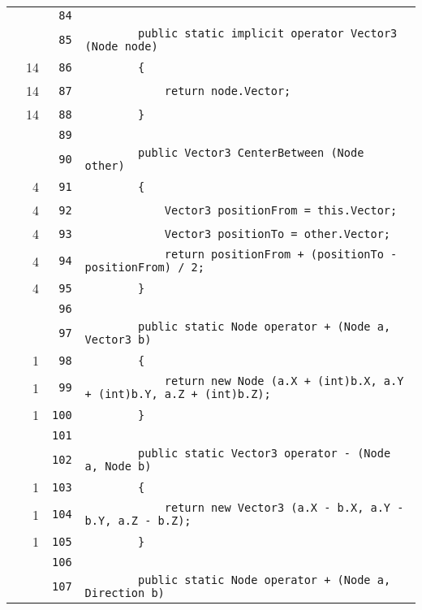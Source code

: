 \documentclass[a4paper,10pt]{article}
\begin{document}
\begin{longtable}[l]{lrrl}
\cellcolor{gray} &  & \verb~84~ & \verb~~\\
\cellcolor{gray} &  & \verb~85~ & \verb~        public static implicit operator Vector3 (Node node)~\\
\cellcolor{green} & 14 & \verb~86~ & \verb~        {~\\
\cellcolor{green} & 14 & \verb~87~ & \verb~            return node.Vector;~\\
\cellcolor{green} & 14 & \verb~88~ & \verb~        }~\\
\cellcolor{gray} &  & \verb~89~ & \verb~~\\
\cellcolor{gray} &  & \verb~90~ & \verb~        public Vector3 CenterBetween (Node other)~\\
\cellcolor{green} & 4 & \verb~91~ & \verb~        {~\\
\cellcolor{green} & 4 & \verb~92~ & \verb~            Vector3 positionFrom = this.Vector;~\\
\cellcolor{green} & 4 & \verb~93~ & \verb~            Vector3 positionTo = other.Vector;~\\
\cellcolor{green} & 4 & \verb~94~ & \verb~            return positionFrom + (positionTo - positionFrom) / 2;~\\
\cellcolor{green} & 4 & \verb~95~ & \verb~        }~\\
\cellcolor{gray} &  & \verb~96~ & \verb~~\\
\cellcolor{gray} &  & \verb~97~ & \verb~        public static Node operator + (Node a, Vector3 b)~\\
\cellcolor{green} & 1 & \verb~98~ & \verb~        {~\\
\cellcolor{green} & 1 & \verb~99~ & \verb~            return new Node (a.X + (int)b.X, a.Y + (int)b.Y, a.Z + (int)b.Z);~\\
\cellcolor{green} & 1 & \verb~100~ & \verb~        }~\\
\cellcolor{gray} &  & \verb~101~ & \verb~~\\
\cellcolor{gray} &  & \verb~102~ & \verb~        public static Vector3 operator - (Node a, Node b)~\\
\cellcolor{green} & 1 & \verb~103~ & \verb~        {~\\
\cellcolor{green} & 1 & \verb~104~ & \verb~            return new Vector3 (a.X - b.X, a.Y - b.Y, a.Z - b.Z);~\\
\cellcolor{green} & 1 & \verb~105~ & \verb~        }~\\
\cellcolor{gray} &  & \verb~106~ & \verb~~\\
\cellcolor{gray} &  & \verb~107~ & \verb~        public static Node operator + (Node a, Direction b)~\\

\end{longtable}
\end{document}
